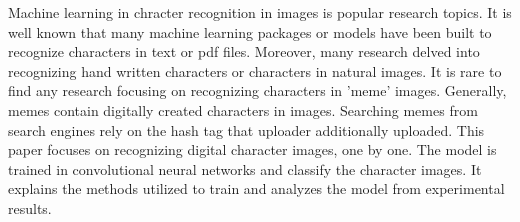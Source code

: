 Machine learning in chracter recognition in images is popular research topics. It is well known that many machine learning
packages or models have been built to recognize characters in text or pdf files. Moreover, many research delved into recognizing
hand written characters or characters in natural images. It is rare to find any research focusing on recognizing characters in
'meme' images. Generally, memes contain digitally created characters in images. Searching memes from search engines rely on the
hash tag that uploader additionally uploaded. This paper focuses on recognizing digital character images, one by one. The model
is trained in convolutional neural networks and classify the character images. It explains the methods utilized to train and
analyzes the model from experimental results.